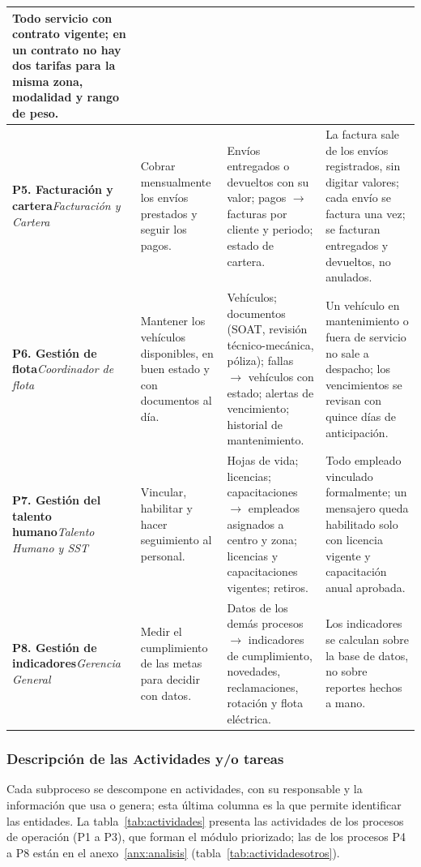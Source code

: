 {\begin{longtable}{L{2.6cm} L{3.3cm} L{4.2cm} L{4.3cm}}
Todo servicio con contrato vigente; en un contrato no hay dos tarifas para la misma zona, modalidad y rango de peso. \\
\midrule
\textbf{P5. Facturación y cartera}\newline\textit{Facturación y Cartera} &
Cobrar mensualmente los envíos prestados y seguir los pagos. &
Envíos entregados o devueltos con su valor; pagos $\rightarrow$ facturas por cliente y periodo; estado de cartera. &
La factura sale de los envíos registrados, sin digitar valores; cada envío se factura una vez; se facturan entregados y devueltos, no anulados. \\
\midrule
\textbf{P6. Gestión de flota}\newline\textit{Coordinador de flota} &
Mantener los vehículos disponibles, en buen estado y con documentos al día. &
Vehículos; documentos (SOAT, revisión técnico-mecánica, póliza); fallas $\rightarrow$ vehículos con estado; alertas de vencimiento; historial de mantenimiento. &
Un vehículo en mantenimiento o fuera de servicio no sale a despacho; los vencimientos se revisan con quince días de anticipación. \\
\midrule
\textbf{P7. Gestión del talento humano}\newline\textit{Talento Humano y SST} &
Vincular, habilitar y hacer seguimiento al personal. &
Hojas de vida; licencias; capacitaciones $\rightarrow$ empleados asignados a centro y zona; licencias y capacitaciones vigentes; retiros. &
Todo empleado vinculado formalmente; un mensajero queda habilitado solo con licencia vigente y capacitación anual aprobada. \\
\midrule
\textbf{P8. Gestión de indicadores}\newline\textit{Gerencia General} &
Medir el cumplimiento de las metas para decidir con datos. &
Datos de los demás procesos $\rightarrow$ indicadores de cumplimiento, novedades, reclamaciones, rotación y flota eléctrica. &
Los indicadores se calculan sobre la base de datos, no sobre reportes hechos a mano. \\
\end{longtable}
\par}

\subsubsection{Descripción de las Actividades y/o tareas}

Cada subproceso se descompone en actividades, con su responsable y la
información que usa o genera; esta última columna es la que permite
identificar las entidades. La tabla~\ref{tab:actividades} presenta las
actividades de los procesos de operación (P1 a P3), que forman el
módulo priorizado; las de los procesos P4 a P8 están en el
anexo~\ref{anx:analisis} (tabla~\ref{tab:actividadesotros}).

